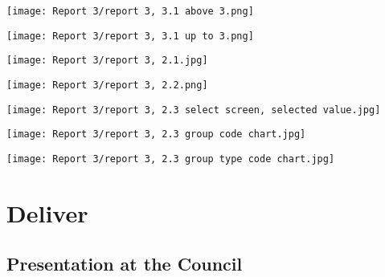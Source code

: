 \begin{center}
  \texttt{[image: Report 3/report 3, 3.1 above 3.png]}
  \label{normal_case}
\end{center}


\begin{center}
  \texttt{[image: Report 3/report 3, 3.1 up to 3.png]}
  \label{normal_case}
\end{center}


\begin{center}
  \texttt{[image: Report 3/report 3, 2.1.jpg]}
  \label{normal_case}
\end{center}

\begin{center}
  \texttt{[image: Report 3/report 3, 2.2.png]}
  \label{normal_case}
\end{center}

\begin{center}
  \texttt{[image: Report 3/report 3, 2.3 select screen, selected value.jpg]}
  \label{normal_case}
\end{center}


\begin{center}
  \texttt{[image: Report 3/report 3, 2.3 group code chart.jpg]}
  \label{normal_case}
\end{center}


\begin{center}
  \texttt{[image: Report 3/report 3, 2.3 group type code chart.jpg]}
  \label{normal_case}
\end{center}


	\section{Deliver}
	
		\subsection{Presentation at the Council}
		
